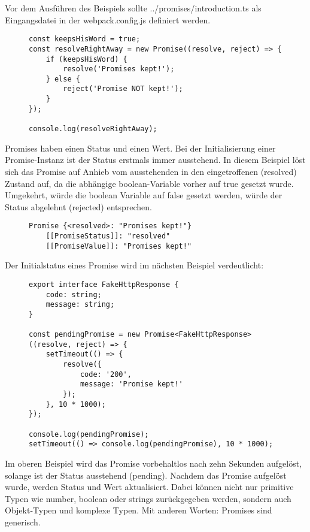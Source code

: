 \noindent
Vor dem Ausführen des Beispiels sollte ../promises/introduction.ts als Eingangsdatei in der webpack.config.js definiert werden.

\begin{figure}[H]
\begin{lstlisting}[basicstyle=\small]
const keepsHisWord = true;
const resolveRightAway = new Promise((resolve, reject) => {
    if (keepsHisWord) {
        resolve('Promises kept!');
    } else {
        reject('Promise NOT kept!');
    }
});

console.log(resolveRightAway);
\end{lstlisting}
\end{figure}

\noindent
Promises haben einen Status und einen Wert. Bei der Initialisierung einer Promise-Instanz ist der Status erstmals immer ausstehend. In diesem Beispiel löst sich das Promise auf Anhieb vom ausstehenden in den eingetroffenen (resolved) Zustand auf, da die abhängige boolean-Variable vorher auf true gesetzt wurde. Umgekehrt, würde die boolean Variable auf false gesetzt werden, würde der Status abgelehnt (rejected) entsprechen.

\begin{figure}[H]
\begin{lstlisting}[basicstyle=\small]
Promise {<resolved>: "Promises kept!"}
    [[PromiseStatus]]: "resolved"
    [[PromiseValue]]: "Promises kept!"
\end{lstlisting}
\end{figure}


\noindent
Der Initialstatus eines Promise wird im nächsten Beispiel verdeutlicht:

\begin{figure}[H]
\begin{lstlisting}[basicstyle=\small]
export interface FakeHttpResponse {
    code: string;
    message: string;
}

const pendingPromise = new Promise<FakeHttpResponse>((resolve, reject) => {
    setTimeout(() => {
        resolve({
            code: '200',
            message: 'Promise kept!'
        });
    }, 10 * 1000);
});

console.log(pendingPromise);
setTimeout(() => console.log(pendingPromise), 10 * 1000);
\end{lstlisting}
\end{figure}

\noindent
Im oberen Beispiel wird das Promise vorbehaltlos nach zehn Sekunden aufgelöst, solange ist der Status ausstehend (pending). Nachdem das Promise aufgelöst wurde, werden Status und Wert aktualisiert. Dabei können nicht nur primitive Typen wie number, boolean oder strings zurückgegeben werden, sondern auch Objekt-Typen und komplexe Typen. Mit anderen Worten: Promises sind generisch.

